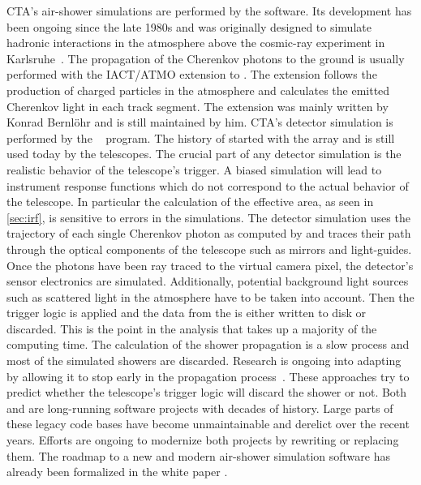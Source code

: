 CTA's air-shower simulations are performed by the \corsika software.
Its development has been ongoing since the late 1980s and was originally designed to simulate hadronic interactions in the atmosphere 
above the \kascade cosmic-ray experiment in Karlsruhe~\cite{kascade-data}. 
The propagation of the Cherenkov photons to the ground is usually performed  with the \mbox{IACT/ATMO} extension to \corsika. The extension follows the 
production of charged particles in the atmosphere and calculates the emitted Cherenkov light in each track segment.
The extension was mainly written by Konrad Bernlöhr and is still maintained by him. 
CTA's detector simulation is performed by the \simtel~\cite{simtel} program. The history of \simtel started with the \hegra array and is still used today by 
the \hess telescopes. The crucial part of any detector simulation is the realistic behavior of the telescope's trigger. 
A biased simulation will lead to instrument response functions which do not correspond to the actual behavior of the telescope.
In particular the calculation of the effective area, as seen in \cref{sec:irf}, is sensitive to errors in the simulations. 
The detector simulation uses the trajectory of each single Cherenkov photon as computed by \corsika and traces their path through the 
optical components of the telescope such as mirrors and light-guides. Once the photons have been ray traced to the virtual camera pixel, 
the detector's sensor electronics are simulated. Additionally, potential background light sources such as scattered light in the atmosphere 
have to be taken into account. Then the trigger logic is applied and the data from the \corsika is either written to disk or discarded.
This is the point in the analysis that takes up a majority of the computing time.
The calculation of the shower propagation is a slow process and most of the simulated showers are discarded. 
Research is ongoing into adapting \corsika by allowing it to stop early in the propagation process~\cite{baack}. 
These approaches try to predict whether the telescope's trigger logic will discard the shower or not.
Both \corsika and \simtel are long-running software projects with decades of history. 
Large parts of these legacy code bases have become unmaintainable and derelict over the recent years.
Efforts are ongoing to modernize both projects by rewriting or replacing them. 
The roadmap to a new and modern air-shower simulation software has already been formalized in the 
white paper \cite{corsika8}.

